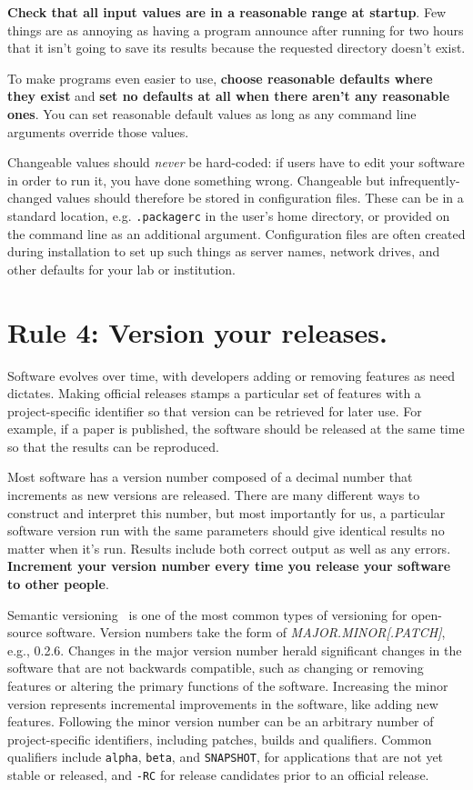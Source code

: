 \documentclass[10pt,letterpaper]{article}
\newcommand{\rulemajor}[1]{\section*{#1}}
\newcommand{\ruleminor}[1]{\textbf{#1}}
\begin{document}
\ruleminor{Check that all input values are in a reasonable range at
startup}.  Few things are as annoying as having a program announce
after running for two hours that it isn't going to save its results
because the requested directory doesn't exist.

To make programs even easier to use, \ruleminor{choose reasonable
defaults where they exist} and \ruleminor{set no defaults at all
when there aren't any reasonable ones}.  You can set reasonable
default values as long as any command line arguments override those
values.

Changeable values should \emph{never} be hard-coded: if users have to
edit your software in order to run it, you have done something wrong.
Changeable but infrequently-changed values should therefore be stored
in configuration files.  These can be in a standard location,
e.g. \texttt{.packagerc} in the user's home directory, or provided on
the command line as an additional argument.  Configuration files are
often created during installation to set up such things as server
names, network drives, and other defaults for your lab or institution.

\rulemajor{Rule 4: Version your releases.}

Software evolves over time, with developers adding or removing
features as need dictates. Making official releases stamps a
particular set of features with a project-specific identifier so that
version can be retrieved for later use. For example, if a paper is
published, the software should be released at the same time so that
the results can be reproduced.

Most software has a version number composed of a decimal number that
increments as new versions are released.  There are many different
ways to construct and interpret this number, but most importantly for
us, a particular software version run with the same parameters should
give identical results no matter when it's run. Results include both
correct output as well as any errors.  \ruleminor{Increment your
version number every time you release your software to other
people}.

Semantic versioning~\cite{semver} is one of the most
common types of versioning for open-source software. Version numbers
take the form of \emph{MAJOR.MINOR{[}.PATCH{]}}, e.g., 0.2.6.  Changes
in the major version number herald significant changes in the software
that are not backwards compatible, such as changing or removing
features or altering the primary functions of the software. Increasing
the minor version represents incremental improvements in the software,
like adding new features. Following the minor version number can be an
arbitrary number of project-specific identifiers, including patches,
builds and qualifiers.  Common qualifiers include \texttt{alpha},
\texttt{beta}, and \texttt{SNAPSHOT}, for applications that are not
yet stable or released, and \texttt{-RC} for release candidates prior
to an official release.
\end{document}
